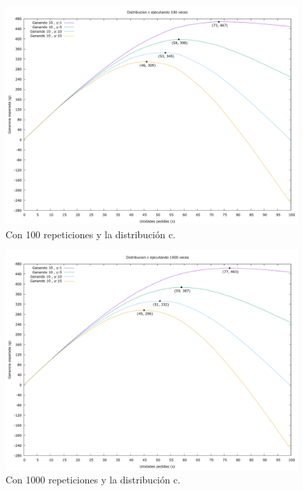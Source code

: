 \documentclass[12pt, spanish]{article}
\begin{document}
\begin{figure}[H]
	\centering
	\includegraphics[scale = 0.3]{prob_c/datos_c_100.png}
	\caption{Con 100 repeticiones y la distribución c.}
	\label{fig:ej1_a_100}

\end{figure}

\begin{figure}[H]
	\centering
	\includegraphics[scale = 0.3]{prob_c/datos_c_1000.png}
	\caption{Con 1000 repeticiones y la distribución c.}
	\label{fig:ej1_a_1000}

\end{figure}
\end{document}

